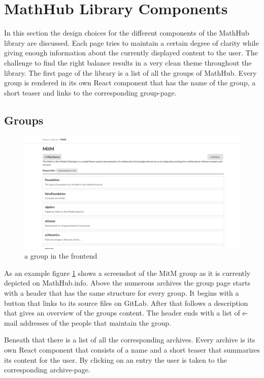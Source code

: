 \documentclass[11pt,a4paper]{article}
\begin{document}
\section{MathHub Library Components} \label{library}
In this section the design choices for the different components of the MathHub library are discussed.
Each page tries to maintain a certain degree of clarity while giving enough information about the currently displayed content to the user.
The challenge to find the right balance results in a very clean theme throughout the library.
The first page of the library is a list of all the groups of MathHub.
Every group is rendered in its own React component that has the name of the group, a short teaser and links to the corresponding group-page.

\subsection{Groups}
\begin{figure}[H]
\includegraphics[width=1\textwidth]{group.png}
\caption{a group in the frontend}
\label{fig:group}
\end{figure}
As an example figure \ref{fig:group} shows a screenshot of the MitM group as it is currently depicted on MathHub.info.
Above the numerous archives the group page starts with a header that has the same structure for every group.
It begins with a button that links to its source files on GitLab.
After that follows a description that gives an overview of the groups content.
The header ends with a list of e-mail addresses of the people that maintain the group.

Beneath that there is a list of all the corresponding archives.
Every archive is its own React component that consists of a name and a short teaser that summarizes its content for the user.
By clicking on an entry the user is taken to the corresponding archive-page.
\end{document}
